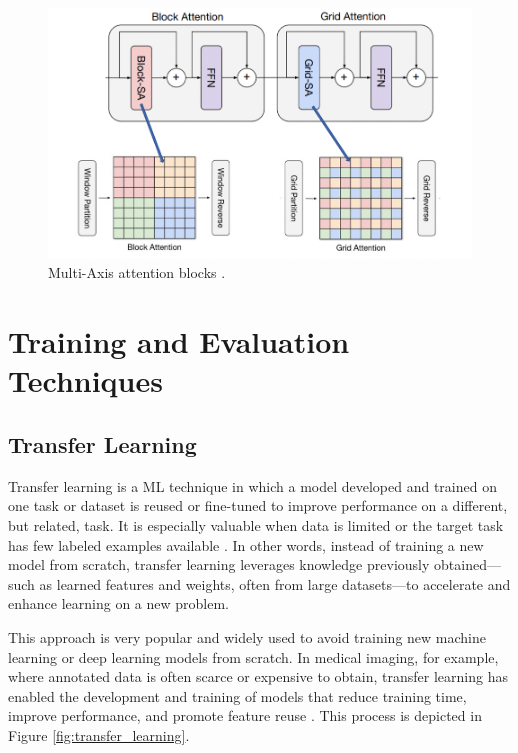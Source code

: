 \documentclass[a4paper,10pt]{book}
\begin{document}
\begin{figure}[h!]
    \centering
    \includegraphics[width=0.6\linewidth]{reports//assets/multi_axis_attention.png}
    \caption[Multi-Axis Attention Blocks]{Multi-Axis attention blocks \cite{noauthor_maxvit-unet_2024}.}
    \label{fig:multi_axis_attention}
\end{figure}


\section{Training and Evaluation Techniques}
\subsection{Transfer Learning}

Transfer learning is a ML technique in which a model developed and trained on one task or dataset is reused or fine-tuned to improve performance on a different, but related, task. It is especially valuable when data is limited or the target task has few labeled examples available \cite{murel_what_2024}. In other words, instead of training a new model from scratch, transfer learning leverages knowledge previously obtained—such as learned features and weights, often from large datasets—to accelerate and enhance learning on a new problem.

This approach is very popular and widely used to avoid training new machine learning or deep learning models from scratch. In medical imaging, for example, where annotated data is often scarce or expensive to obtain, transfer learning has enabled the development and training of models that reduce training time, improve performance, and promote feature reuse \cite{matsoukas_what_2022}. This process is depicted in Figure \ref{fig:transfer_learning}.
\end{document}
